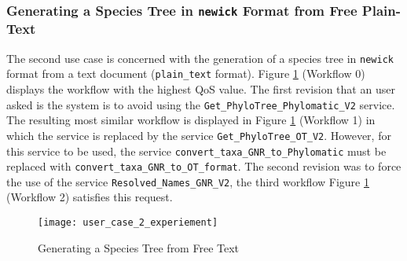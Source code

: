 \documentclass{new_tlp}
\begin{document}
 
\subsubsection{Generating a Species Tree in  \texttt{\small newick} Format from Free Plain-Text}

The second use case is concerned with the generation of a species tree in  \texttt{\small newick} format from a text document  (\texttt{\small plain\_text} format). Figure \ref{user_case_2_experiement} (Workflow 0) displays the workflow with the highest QoS value. The first revision that an user asked is the system is to avoid using the \texttt{\small Get\_PhyloTree\_Phylomatic\_V2} service. The resulting most similar workflow is displayed in 
Figure \ref{user_case_2_experiement} (Workflow 1) in which the service is replaced by the service \texttt{\small Get\_PhyloTree\_OT\_V2}. However, for this service to be used, the service \texttt{\small convert\_taxa\_GNR\_to\_Phylomatic} must be replaced with \texttt{\small convert\_taxa\_GNR\_to\_OT\_format}. The second revision was to force the use of the service  \texttt{\small Resolved\_Names\_GNR\_V2}, the third workflow Figure \ref{user_case_2_experiement} (Workflow 2) satisfies this request. 

\begin{figure}[t]
	\centering	\texttt{[image: user\_case\_2\_experiement]}
	\caption{Generating a Species Tree from Free Text  \label{user_case_2_experiement}}
\end{figure}


\end{document}
